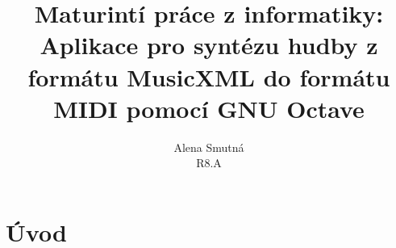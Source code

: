 \documentclass[a4paper,titlepage]{article}
\title{Maturintí práce z informatiky:\\
	Aplikace pro syntézu hudby z formátu MusicXML do formátu MIDI pomocí GNU Octave}
\author{Alena Smutná\\
	R8.A\\}
\begin{document}
\maketitle
\section{Úvod}
\end{document}
